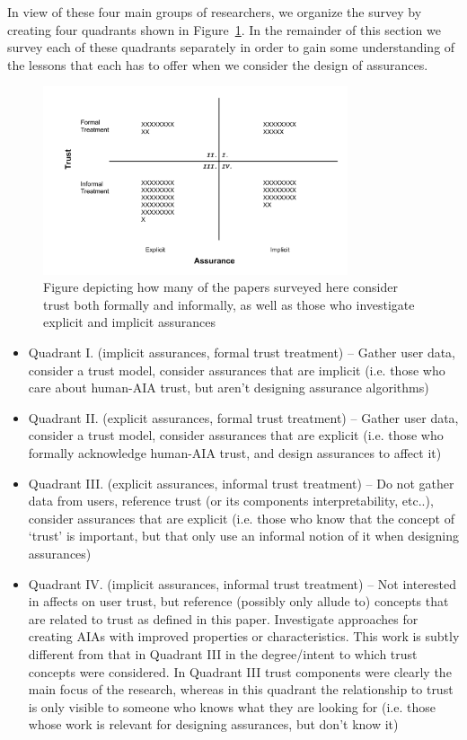 In view of these four main groups of researchers, we organize the survey by creating four quadrants shown in Figure~\ref{fig:trust_assurance_intention}. In the remainder of this section we survey each of these quadrants separately in order to gain some understanding of the lessons that each has to offer when we consider the design of assurances.

\begin{figure}[htbp]
    \centering
    \includegraphics[width=0.8\textwidth]{Figures/Trust_vs_Assurance_Intention.pdf}
    \caption{Figure depicting how many of the papers surveyed here consider trust both formally and informally, as well as those who investigate explicit and implicit assurances}
    \label{fig:trust_assurance_intention}
\end{figure}

\begin{itemize}
    \item Quadrant I. (implicit assurances, formal trust treatment) -- Gather user data, consider a trust model, consider assurances that are implicit (i.e. those who care about human-AIA trust, but aren't designing assurance algorithms)
    \item Quadrant II. (explicit assurances, formal trust treatment) -- Gather user data, consider a trust model, consider assurances that are explicit (i.e. those who formally acknowledge human-AIA trust, and design assurances to affect it)
    \item Quadrant III. (explicit assurances, informal trust treatment) -- Do not gather data from users, reference trust (or its components interpretability, etc..), consider assurances that are explicit (i.e. those who know that the concept of `trust' is important, but that only use an informal notion of it when designing assurances)
    \item Quadrant IV. (implicit assurances, informal trust treatment) -- Not interested in affects on user trust, but reference (possibly only allude to) concepts that are related to trust as defined in this paper. Investigate approaches for creating AIAs with improved properties or characteristics. This work is subtly different from that in Quadrant III in the degree/intent to which trust concepts were considered. In Quadrant III trust components were clearly the main focus of the research, whereas in this quadrant the relationship to trust is only visible to someone who knows what they are looking for (i.e. those whose work is relevant for designing assurances, but don't know it)
\end{itemize}





